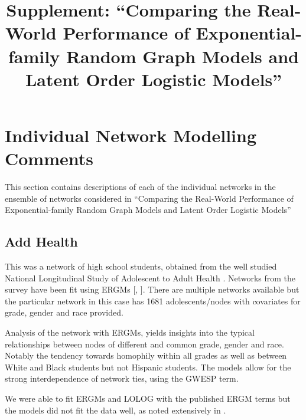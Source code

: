 \documentclass[
]{statsoc}
\title{Supplement: ``Comparing the Real-World Performance of Exponential-family
Random Graph Models and Latent Order Logistic Models''}
\author{}
\date{\vspace{-2.5em}}
\begin{document}
\maketitle

\newcommand{\R}{\mathbb{R}}
\newcommand{\N}{\mathbb{N}}
\newcommand{\E}{\mathbb{E}}
\newcommand{\V}{\mathbb{V}}
\newcommand{\bfR}{\mathbf{R}}
\newcommand{\bfX}{\mathbf{X}}
\newcommand{\bfW}{\mathbf{W}}
\newcommand{\bfD}{\mathbf{D}}
\newcommand{\INT}{\int_{-\infty}^{+\infty}}
\newcommand{\p}{\partial}
\newcommand{\ra}{\Rightarrow}
\newcommand{\dH}{d\mathscr{H}}
\newcommand{\ch}{\text{cosh}}
\newcommand{\sh}{\text{sinh}}
\newcommand{\ex}{\mathbb{E}\left[X\right]}
\newcommand{\ey}{\mathbb{E}\left[Y\right]}
\newcommand{\logit}{{\rm logit}}
\newcommand{\MOM}{{\rm MOM}}

\setcounter{secnumdepth}{4}

\section{Individual Network Modelling Comments}\label{app:comments}

This section contains descriptions of each of the individual networks in
the ensemble of networks considered in ``Comparing the Real-World
Performance of Exponential-family Random Graph Models and Latent Order
Logistic Models''

\subsection{Add Health}

This was a network of high school students, obtained from the well
studied National Longitudinal Study of Adolescent to Adult Health
\citep{AddHealth2007}. Networks from the survey have been fit using
ERGMs {[}\cite{Goodreau2007}, \cite{Hunter_Goodreau_2008}{]}. There are
multiple networks available but the particular network in this case has
1681 adolescents/nodes with covariates for grade, gender and race
provided.

Analysis of the network with ERGMs, yields insights into the typical
relationships between nodes of different and common grade, gender and
race. Notably the tendency towards homophily within all grades as well
as between White and Black students but not Hispanic students. The
models allow for the strong interdependence of network ties, using the
GWESP term.

We were able to fit ERGMs and LOLOG with the published ERGM terms but
the models did not fit the data well, as noted extensively in
\cite{Goodreau2007}.
\end{document}
